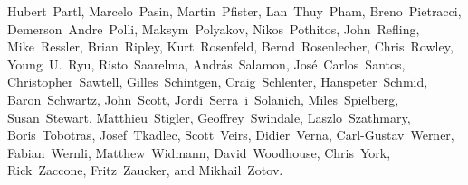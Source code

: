 \begin{flushleft}
Hubert~Partl,           %
Marcelo~Pasin,          %
Martin~Pfister,		%
Lan~Thuy~Pham,          %
Breno~Pietracci,        %
Demerson~Andre~Polli,   %
Maksym~Polyakov,        %
Nikos~Pothitos,		%
John~Refling,           %
Mike~Ressler,           %
Brian~Ripley,           %
Kurt~Rosenfeld,		%
Bernd~Rosenlecher,      %
Chris~Rowley,           %
Young~U.~Ryu,           %
Risto~Saarelma,         %
Andr{\'a}s~Salamon,     %
Jos\'e~Carlos~Santos,   %
Christopher~Sawtell,    %
Gilles~Schintgen,       %
Craig~Schlenter,        %
Hanspeter~Schmid,       %
Baron~Schwartz,         %
John~Scott,             %
Jordi~Serra~i~Solanich, %
Miles~Spielberg,        %
Susan~Stewart,
Matthieu~Stigler,
Geoffrey~Swindale,      %
Laszlo~Szathmary,       %
Boris~Tobotras,         %
Josef~Tkadlec,          %
Scott~Veirs,            %
Didier~Verna,           %
Carl-Gustav~Werner,     %
Fabian~Wernli,          %
Matthew~Widmann,        %
David~Woodhouse,        %
Chris~York,             %
Rick~Zaccone,           %
Fritz~Zaucker,          %
and Mikhail~Zotov.      %
\end{flushleft}

